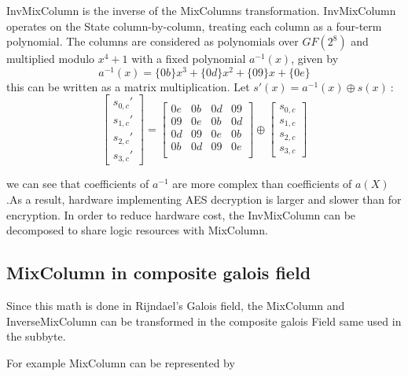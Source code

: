\documentclass[10pt, conference, compsocconf]{IEEEtran}
\begin{document}
InvMixColumn is the inverse of the MixColumns transformation. InvMixColumn operates on the State column-by-column, treating each column as a four-term polynomial. The columns are considered as polynomials over $GF(2^8)$ and multiplied modulo $x^4 + 1 $ with a fixed polynomial $a^{-1}(x)$, given by 
\begin{equation}
a^{-1}(x) = \{0b\}x^3 + \{0d\}x^2 + \{09\}x + \{0e\}
\end{equation}
this can be written as a matrix multiplication. Let 
$s'(x) = a^{-1}(x) \oplus s(x)~ :$
\begin{equation}
\left[ \begin{array}{c}
s_{0,c}' \\s_{1,c}' \\s_{2,c}' \\s_{3,c}' \end{array} \right] =
\left[ \begin{array}{cccccccc}
0e & 0b & 0d & 09\\
09 & 0e & 0b & 0d\\
0d & 09 & 0e & 0b\\
0b & 0d & 09 & 0e\\
 \end{array} \right] \oplus
 \left[ \begin{array}{c}
s_{0,c}\\s_{1,c}\\s_{2,c}\\s_{3,c} \end{array} \right]
\end{equation}

we can see that coefficients of $a^{-1}$ are more complex than coefficients of $a(X)$.As a result, hardware implementing AES decryption is larger and slower than for encryption. In order to reduce hardware cost, the InvMixColumn can be decomposed to share logic resources with MixColumn.

\subsection {MixColumn in composite galois field}
Since this math is done in Rijndael's Galois field, the MixColumn and InverseMixColumn can be transformed \cite{Rudra2001} in the composite galois Field same used in the subbyte.

For example MixColumn can be represented by
\end{document}
